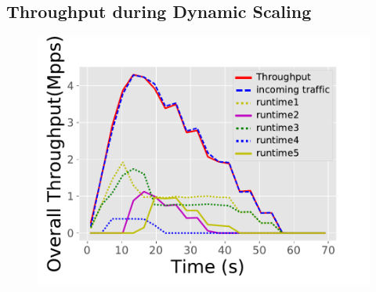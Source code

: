 \subsection{Throughput during Dynamic Scaling}


\begin{figure}[!t]
\captionsetup{width=0.3\textwidth}
\vspace*{-7mm}
\begin{center}
\begin{minipage}[t]{0.35\linewidth}
\includegraphics[width=\textwidth]{figure/Scale.pdf}


\end{minipage}
\end{center}
\end{figure}

